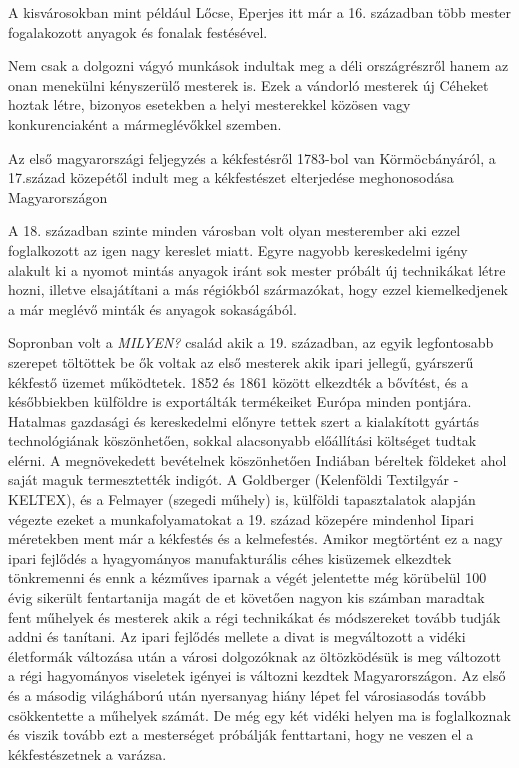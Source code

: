 \documentclass[fontsize=12pt, appendixprefix=true]{scrreprt}
\begin{document}
A kisvárosokban mint például Lőcse, Eperjes itt már a 16. században több mester  fogalakozott anyagok és fonalak  festésével. 

Nem csak a dolgozni vágyó munkások indultak meg a déli országrészről hanem az onan menekülni kényszerülő mesterek is. Ezek a vándorló mesterek új Céheket hoztak létre, bizonyos esetekben a helyi mesterekkel közösen vagy konkurenciaként a mármeglévőkkel szemben. 

Az első magyarországi feljegyzés a kékfestésről 1783-bol van Körmöcbányáról, a 17.század közepétől indult meg a kékfestészet elterjedése meghonosodása Magyarországon  %

A 18. században szinte minden városban volt olyan mesterember aki ezzel foglalkozott az igen nagy kereslet miatt. Egyre nagyobb kereskedelmi igény alakult ki a nyomot mintás anyagok iránt sok mester próbált új technikákat létre hozni, illetve  elsajátítani a más régiókból származókat, hogy ezzel kiemelkedjenek a már meglévő minták és anyagok sokaságából.

Sopronban volt a \textit{MILYEN?} család akik a 19. században, az egyik legfontosabb szerepet töltöttek be ők voltak az első mesterek akik ipari jellegű, gyárszerű  kékfestő üzemet működtetek.
1852 és 1861 között elkezdték a bővítést, és a későbbiekben külföldre is exportálták termékeiket Európa minden pontjára. Hatalmas gazdasági és kereskedelmi előnyre tettek szert a kialakított gyártás technológiának köszönhetően, sokkal alacsonyabb előállítási költséget tudtak elérni. A megnövekedett bevételnek köszönhetően Indiában béreltek földeket ahol saját maguk termesztették indigót.
A Goldberger (Kelenföldi Textilgyár - KELTEX), és a Felmayer (szegedi műhely) is, külföldi tapasztalatok alapján végezte ezeket a  munkafolyamatokat a 19. század közepére mindenhol Iipari méretekben ment már a kékfestés és a kelmefestés.
Amikor megtörtént ez a nagy ipari fejlődés a hyagyományos manufakturális céhes kisüzemek elkezdtek tönkremenni és ennk a kézműves iparnak a végét jelentette még körübelül 100 évig sikerült fentartanija magát de et követően nagyon kis számban maradtak fent műhelyek és mesterek akik a régi technikákat és módszereket tovább tudják addni és tanítani.
Az ipari fejlődés mellete a divat is megváltozott a vidéki életformák változása után a városi dolgozóknak az öltözködésük is meg változott a régi hagyományos viseletek igényei is változni kezdtek Magyarországon.
Az első és a másodig világháború után nyersanyag hiány lépet fel városiasodás tovább csökkentette a műhelyek számát.
De még egy két vidéki helyen ma is foglalkoznak és viszik tovább ezt a mesterséget próbálják fenttartani, hogy ne veszen el a kékfestészetnek a varázsa.
\end{document}
